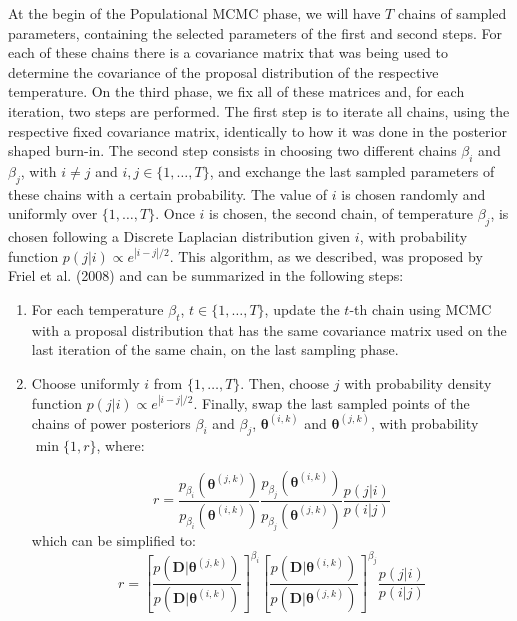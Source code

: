 At the begin of the Populational MCMC phase, we will have $T$ chains of 
sampled parameters, containing the selected parameters of the first and 
second steps. For each of these chains there is a covariance matrix that 
was being used to determine the covariance of the proposal distribution 
of the respective temperature. On the third phase, we fix all of these
matrices and, for each iteration, two steps are performed. The first
step is to iterate all chains, using the respective fixed covariance 
matrix, identically to how it was done in the posterior shaped burn-in.
The second step consists in choosing two different chains $\beta_i$ and
$\beta_j$, with $i \neq j$ and $i, j \in \{1, \ldots, T\}$, and exchange
the last sampled parameters of these chains with a certain probability.
The value of $i$ is chosen randomly and uniformly over $\{1, \ldots,
T\}$. Once $i$ is chosen, the second chain, of temperature $\beta_j$, is
chosen following a Discrete Laplacian distribution given $i$, with 
probability function $p (j | i) \propto e^{|i - j| / 2}$. This
algorithm, as we described, was proposed by Friel et al. (2008) and can 
be summarized in the following steps:
\begin{enumerate}
    \item{For each temperature $\beta_t$, $t \in \{1, \ldots, T\}$, 
        update the $t$-th chain using MCMC with a proposal distribution
        that has the same covariance matrix used on the last iteration
        of the same chain, on the last sampling phase.}
    \item{Choose uniformly $i$ from $\{1, \ldots, T\}$. Then, choose
        $j$ with probability density function $p (j | i) \propto 
        e^{|i - j| / 2}$. Finally, swap the last sampled points of 
        the chains of power posteriors $\beta_i$ and $\beta_j$, 
        ${\bm \theta}^{(i, k)}$ and ${\bm \theta}^{(j, k)}$, with 
        probability $\min\{1, r\}$, where: }

    \begin{equation*}
        r = \frac{p_{\beta_i}\left({\bm \theta}^{(j, k)}\right)}
             {p_{\beta_i}\left({\bm \theta}^{(i, k)}\right)}
        \frac{p_{\beta_j}\left({\bm \theta}^{(i, k)}\right)}
             {p_{\beta_j}\left({\bm \theta}^{(j, k)}\right)}
        \frac{p (j | i)}
             {p (i | j)}
    \end{equation*}
    which can be simplified to:
    \begin{equation*}
        r = \left[\frac{p \left({\bm D} | {\bm \theta}^{(j, k)}\right)}
                {p \left({\bm D} | {\bm \theta}^{(i,
                k)}\right)}\right]^{\beta_i}
            \left[\frac{p \left({\bm D} | {\bm \theta}^{(i, k)}\right)}
                {p \left({\bm D} | {\bm \theta}^{(j,
                k)}\right)}\right]^{\beta_j}
            \frac{p (j | i)}
                 {p (i | j)}
    \end{equation*}
\end{enumerate}

